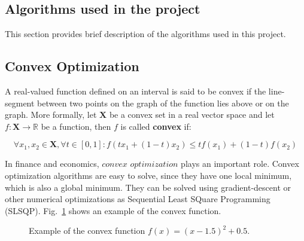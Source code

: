 \documentclass[12pt]{article}
\begin{document}
\begin{itemize}
\section{Algorithms used in the project}
\label{sec:algos}

This section provides brief description of the algorithms used in this project.

\subsection{Convex Optimization}
\label{sec:convex}
A real-valued function defined on an interval is said to be convex if the line-segment between two points on the graph of the function lies above or on the graph. More formally, let $\mathbf{X}$ be a convex set in a real vector space and let $f: \mathbf{X}\rightarrow \mathbb{R}$ be a function, then $f$ is called \textbf{convex} if:

\[\forall x_1,x_2 \in \mathbf{X}, \forall t \in [0,1]: f(tx_1+(1-t)x_2) \leq tf(x_1)+(1-t)f(x_2 )\]

In finance and economics, $convex$ $optimization$ plays an important role. Convex optimization algorithms are easy to solve, since they have one local minimum, which is also a global minimum. They can be solved using gradient-descent or other numerical optimizations as Sequential Least SQuare Programming (SLSQP). Fig.~\ref{fig:convex} shows an example of the convex function.

\begin{figure}[!htbp]
\begin{center}
\caption{Example of the convex function $f(x)=(x-1.5)^2+0.5$.}
\label{fig:convex}
\end{center}
\end{figure}


\end{itemize}
\end{document}
